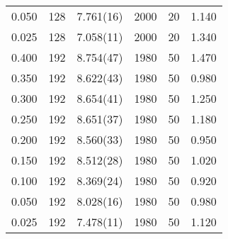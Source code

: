 \begin{tabular}{rrlrrr}
 0.050 &     128 & 7.761(16) &                 2000 &                   20 &    1.140 \\
 0.025 &     128 & 7.058(11) &                 2000 &                   20 &    1.340 \\
 0.400 &     192 & 8.754(47) &                 1980 &                   50 &    1.470 \\
 0.350 &     192 & 8.622(43) &                 1980 &                   50 &    0.980 \\
 0.300 &     192 & 8.654(41) &                 1980 &                   50 &    1.250 \\
 0.250 &     192 & 8.651(37) &                 1980 &                   50 &    1.180 \\
 0.200 &     192 & 8.560(33) &                 1980 &                   50 &    0.950 \\
 0.150 &     192 & 8.512(28) &                 1980 &                   50 &    1.020 \\
 0.100 &     192 & 8.369(24) &                 1980 &                   50 &    0.920 \\
 0.050 &     192 & 8.028(16) &                 1980 &                   50 &    0.980 \\
 0.025 &     192 & 7.478(11) &                 1980 &                   50 &    1.120 \\
\hline
\end{tabular}
